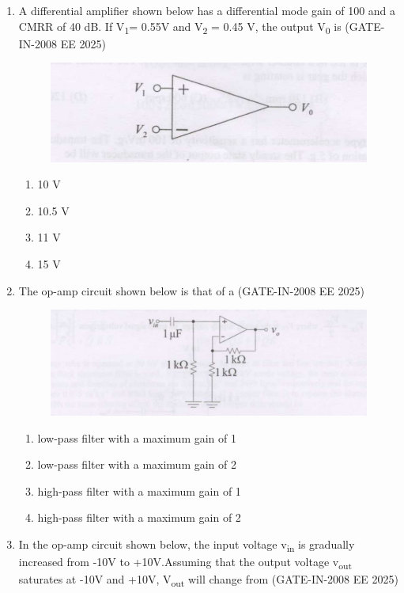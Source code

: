 \documentclass[journal,12pt,onecolumn]{IEEEtran}
\theoremstyle{remark}
\begin{document}
\begin{enumerate}[label=Q.\arabic*,start=1]
    \item A differential amplifier shown below has a differential mode gain of 100 and a CMRR of 40 dB. If V\textsubscript{1}= 0.55V  and V\textsubscript{2} = 0.45 V, the output V\textsubscript{0} is (GATE-IN-2008 EE 2025)

 \begin{figure}[H]
    \centering
    \includegraphics[width=0.5\linewidth]{figs/i18.jpg}
    \label{fig:placeholder18}
\end{figure}
     
    \begin{enumerate} 
        \item 10 V 
        \item 10.5 V
        \item 11 V
        \item 15 V
    \end{enumerate}
    

    \item  The op-amp circuit shown below is that of a (GATE-IN-2008 EE 2025)
    \begin{figure}[H]
    \centering
    \includegraphics[width=0.5\linewidth]{figs/i19.jpg}
    \label{fig:placeholder19}
\end{figure}
    \begin{enumerate} 
        \item low-pass filter with a maximum gain of 1 
        \item low-pass filter with a maximum gain of 2
        \item high-pass filter with a maximum gain of 1 
        \item high-pass filter with a maximum gain of 2
    \end{enumerate}
    
    \item In the op-amp circuit shown below, the input voltage v\textsubscript{in} is gradually increased from -10V to +10V.Assuming that the output voltage v\textsubscript{out} saturates at -10V and +10V, V\textsubscript{out} will change from (GATE-IN-2008 EE 2025)
    

\end{enumerate}
\end{document}
